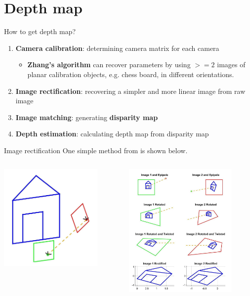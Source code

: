 \documentclass{beamer}
\begin{document}
\section{Depth map}
\begin{frame}{How to get depth map?}
    \begin{enumerate}
        \item \textbf{Camera calibration}: determining camera matrix for each camera
        \begin{itemize}
            \item \textbf{Zhang's algorithm} \cite{zhang_flexible_2000} can recover parameters by using $>=2$ images of planar calibration objects, e.g. chess board, in different orientations.
        \end{itemize}
        \item \textbf{Image rectification}: recovering a simpler and more linear image from raw image
        \item \textbf{Image matching}: generating \textbf{disparity map}
        \item \textbf{Depth estimation}: calculating depth map from disparity map
    \end{enumerate}
\end{frame}

\begin{frame}{Image rectification}
    One simple method from \cite{fusiello_compact_2000} is shown below.
    \begin{columns}
        \begin{column}{.3\linewidth}\centering
        \includegraphics[width=5cm]{image_rectification_1.jpg}
        \end{column}
        \begin{column}{.6\linewidth}\centering
        \includegraphics[width=5.5cm]{image_rectification_2.jpg}
        \end{column}
    \end{columns}
\end{frame}
\end{document}

